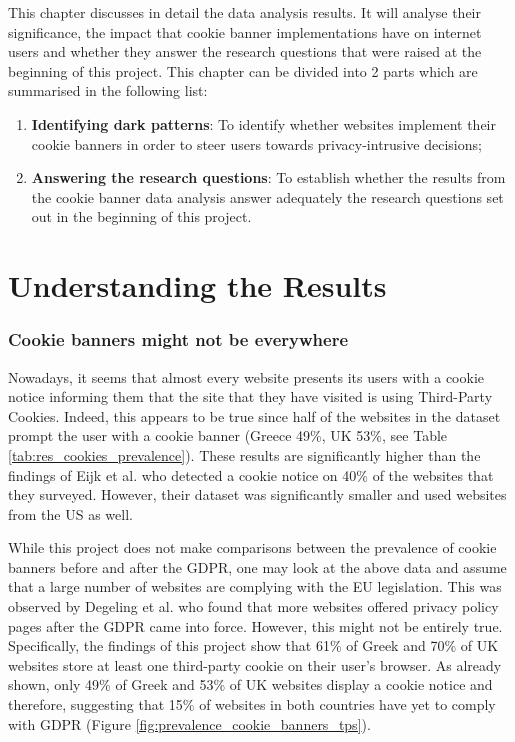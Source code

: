 \documentclass[../main.tex]{subfiles}
\begin{document}
This chapter discusses in detail the data analysis results. It will analyse their significance, the impact that cookie banner implementations have on internet users and whether they answer the research questions that were raised at the beginning of this project. This chapter can be divided into 2 parts which are summarised in the following list: 

\begin{enumerate}
    \item \textbf{Identifying dark patterns}: To identify whether websites implement their cookie banners in order to steer users towards privacy-intrusive decisions; 
    \item \textbf{Answering the research questions}: To establish whether the results from the cookie banner data analysis answer adequately the research questions set out in the beginning of this project.
\end{enumerate}

\section{Understanding the Results}

\subsubsection{Cookie banners might not be everywhere}
Nowadays, it seems that almost every website presents its users with a cookie notice informing them that the site that they have visited is using Third-Party Cookies. Indeed, this appears to be true since half of the websites in the dataset prompt the user with a cookie banner (Greece 49\%, UK 53\%, see Table \ref{tab:res_cookies_prevalence}). These results are significantly higher than the findings of Eijk et al. \cite{eijk2019impact} who detected a cookie notice on 40\% of the websites that they surveyed. However, their dataset was significantly smaller and used websites from the US as well.

While this project does not make comparisons between the prevalence of cookie banners before and after the GDPR, one may look at the above data and assume that a large number of websites are complying with the EU legislation. This was observed by Degeling et al. \cite{degeling2018we} who found that more websites offered privacy policy pages after the GDPR came into force. However, this might not be entirely true. Specifically, the findings of this project show that 61\% of Greek and 70\% of UK websites store at least one third-party cookie on their user’s browser. As already shown, only 49\% of Greek and 53\% of UK websites display a cookie notice and therefore, suggesting that 15\% of websites in both countries have yet to comply with GDPR (Figure \ref{fig:prevalence_cookie_banners_tps}).
\end{document}
